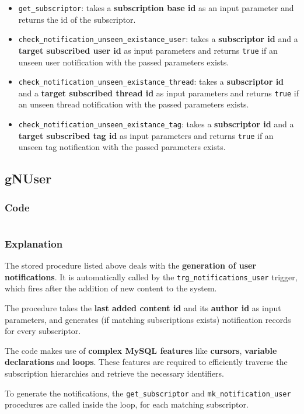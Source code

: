 \documentclass[12pt]{report}
\renewcommand\emph{\textbf}
\newcommand{\printSQLtest}[1]
{
    \inputminted[linenos, breaklines, breakbytoken, tabsize=4, fontsize=\footnotesize]{mysql}{#1}
}
\newcommand{\printSQLTablepage}[2]
{    
    \subsection{#2}
    \subsubsection{Code}
    \printSQLtest{../sql/parts/#1}
    \subsubsection{Explanation}
}
\begin{document}
                    \begin{itemize}
                        \item \texttt{get_subscriptor}: takes a \emph{subscription base id} as an input parameter and returns the id of the subscriptor.
                        \item \texttt{check_notification_unseen_existance_user}: takes a \emph{subscriptor id} and a \emph{target subscribed user id} as input parameters and returns \texttt{true} if an unseen user notification with the passed parameters exists.
                        \item \texttt{check_notification_unseen_existance_thread}: takes a \emph{subscriptor id} and a \emph{target subscribed thread id} as input parameters and returns \texttt{true} if an unseen thread notification with the passed parameters exists.
                        \item \texttt{check_notification_unseen_existance_tag}: takes a \emph{subscriptor id} and a \emph{target subscribed tag id} as input parameters and returns \texttt{true} if an unseen tag notification with the passed parameters exists.                        
                    \end{itemize}

                \newpage

                \printSQLTablepage{25_procGNUser.sql}{gNUser}
                    The stored procedure listed above deals with the \emph{generation of user notifications}. It is automatically called by the \texttt{trg_notifications_user} trigger, which fires after the addition of new content to the system.

                    The procedure takes the \emph{last added content id} and its \emph{author id} as input parameters, and generates (if matching subscriptions exists) notification records for every subscriptor.

                    The code makes use of \emph{complex MySQL features} like \emph{cursors}, \emph{variable declarations} and \emph{loops}.
                    These features are required to efficiently traverse the subscription hierarchies and retrieve the necessary identifiers.

                    To generate the notifications, the \texttt{get_subscriptor} and \texttt{mk_notification_user} procedures are called inside the loop, for each matching subscriptor.
\end{document}
